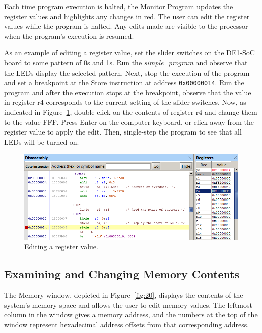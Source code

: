 \documentclass[11pt, twoside, pdftex]{article}
\begin{document}
Each time program execution is halted, the Monitor Program
updates the register values and highlights any changes in red.
The user can edit the register values while the program is
halted. Any edits made are visible to the processor when the
program's execution is resumed.

As an example of editing a register value, set the slider
switches on the DE1-SoC board to some pattern of 0s and 1s.
Run the {\it simple\_program} and observe that the LEDs display
the selected pattern. Next, stop the execution of the program
and set a breakpoint at the Store instruction
at address \texttt{0x00000014}. Run the program and
after the execution stops at the breakpoint, observe that the
value in register r4 corresponds to the current setting of the
slider switches. 
Now,  as indicated in Figure~\ref{fig:19}, double-click on the contents of
register r4 and change them to the value FFF.  
Press \textsf{Enter} on the computer keyboard, or click away from
the register value to apply the edit. 
Then, single-step the program to see that all LEDs will be
turned on. 

\begin{figure}[H]
   \begin{center}
      \includegraphics[scale=1]{screenshots/figure19.png}
   \end{center}
   \caption{Editing a register value.} 
	 \label{fig:19}
\end{figure}


\subsection{Examining and Changing Memory Contents}

The Memory window, depicted in Figure~\ref{fig:20}, displays the contents
of the system's memory space and allows the user to edit memory
values. The leftmost column in the window gives a memory address,
and the numbers at the top of the window represent hexadecimal
address offsets from that corresponding address. 
\end{document}
